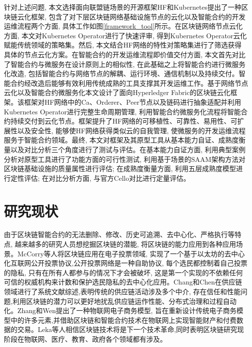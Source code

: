 针对上述问题, 本文选择面向联盟链场景的开源框架HF和Kubernetes提出了一种区块链云化框架, 包含了对下层区块链网络基础设施节点的云化以及智能合约的开发运维流程两个方面, 具体工作如图\ref{framework_tool}所示。在区块链网络节点云化方面, 本文对Kubernetes Operator进行了快速评审, 得到Kubernetes Operator云化赋能传统领域的策略集。然后, 本文结合HF网络的特性对策略集进行了筛选获得具体的节点云化方案。在智能合约的开发运维流程即价值交付方面, 本文首先对比了智能合约与微服务在设计原则上的相似性, 在此基础之上将智能合约进行微服务化改造, 包括智能合约与网络节点的解耦、运行环境、通信机制以及持续交付。智能合约经改造后能够有效利用传统成熟的工具支撑其开发运维工作。基于网络节点云化以及智能合约微服务化本文设计了面向Hyperledger Fabric的区块链云化框架。该框架对HF网络中的Ca、Orderer、Peer节点以及链码进行抽象适配并利用Kubernetes Operator进行完整生命周期管理, 利用智能合约微服务化流程将智能合约持续交付到云化节点。框架提升了HF网络的可移植性、可靠性、易用性、可扩展性以及安全性, 能够使HF网络获得类似云的自我管理, 使微服务的开发运维流程服务于智能合约领域。最终, 本文对框架及其原型工具从基本能力自证、成熟度衡量以及对比分析三个角度进行了测试与评估。在基本能力自证方面, 利用典型案例分析对原型工具进行了功能方面的可行性测试, 利用基于场景的SAAM架构方法对区块链基础设施的质量属性进行评估; 在成熟度衡量方面, 利用五层成熟度模型进行定性评估; 在对比分析方面, 与官方Cello对比进行定量评估。

\section{研究现状}

由于区块链智能合约的无法删除、修改、历史可追溯、去中心化、严格执行等特点, 越来越多的研究人员想挖掘区块链的潜能, 将区块链的能力应用到各种应用场景。McCorry等人\cite{mccorry2017smart}将区块链应用在电子投票领域, 实现了一个基于以太坊的去中心化互联网公开投票协议,公开投票网络是一种自助协议, 每个选民都控制着自己投票的隐私, 只有在所有人都参与的情况下才会被破坏, 这是第一个实现的不依赖任何可信的权威机构来计数和保护选民隐私的去中心化应用。Chang和Chen\cite{chang2020blockchain}在供应链领域进行了系统文献综述,表明传统的供应链活动涉及多个中介, 存在信任和性能问题,利用区块链的潜力可以更好地扰乱供应链运作性能、分布式治理和过程自动化。Zhang和Wen\cite{zhang2017iot}提出了一种物联网电子商务模型, 旨在重新设计传统电子商务模型中的许多元素,并借助区块链和智能合约技术在物联网上实现智能财产和付费数据的交易。Leka等人\cite{leka2019systematic}相信区块链技术将是下一个技术革命,同时表明区块链研究现阶段在物联网\cite{christidis2016blockchains}、医疗、教育、政府各个领域都有涉及。


